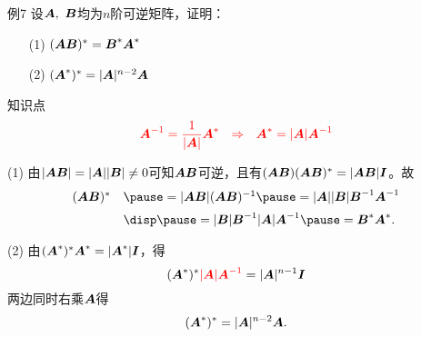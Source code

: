 \begin{frame}
  \begin{footnotesize}
    \begin{exampleblock}{例7}
      设$\A,~\B$均为$n$阶可逆矩阵，证明：
      \begin{itemize}
      \item[(1)] $(\A\B)^*=\B^*\A^*$\\[0.2cm]
      \item[(2)] $(\A^*)^*=|\A|^{n-2}\A$ 
      \end{itemize}
    \end{exampleblock}
    \pause 
    \begin{block}{知识点}
      $$
      \red{\A^{-1}=\frac1{|\A|}\A^* ~~\Rightarrow~~ \A^*=|\A|\A^{-1}}
      $$
    \end{block}
    \pause 
    \proofname
    (1) 由$|\A\B| = |\A||\B| \ne 0$可知$\A\B$可逆，且有$(\A\B)(\A\B)^*=|\A\B|\II$。故
    $$
    \begin{array}{cl}
      (\A\B)^* &  \pause=|\A\B| (\A\B)^{-1}
      \pause= |\A||\B| \B^{-1}\A^{-1} \\[0.2cm]
      & \disp \pause= |\B| \B^{-1} |\A| \A^{-1}   \pause= \B^*\A^*.      
    \end{array}
    $$
    \pause

    (2) 由$(\A^*)^* \A^* = |\A^*|\II$，得\pause 
    $$(\A^*)^* \red{|\A|\A^{-1}} = |\A|^{n-1}\II$$ \pause 
    两边同时右乘$\A$得
    $$
    (\A^*)^*=|\A|^{n-2}\A.
    $$
  \end{footnotesize}
\end{frame}


